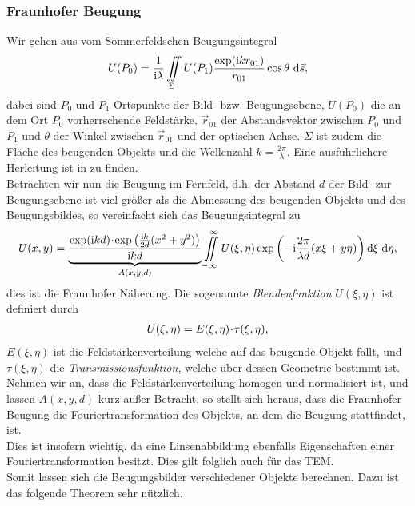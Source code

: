 \subsubsection{Fraunhofer Beugung}
Wir gehen aus vom Sommerfeldschen Beugungsintegral
\begin{align}
U(P_0)=\frac{1}{\mathrm{i}\lambda}\iint\limits_\Sigma U(P_1)\frac{\exp(\mathrm{i}kr_{01})}{r_{01}}\cos\theta~\mathrm{d} \vec{s},
\end{align}
dabei sind $P_0$ und $P_1$ Ortspunkte der Bild- bzw. Beugungsebene, $U(P_0)$ die an dem Ort $P_0$ vorherrschende Feldstärke, $\vec{r}_{01}$ der Abstandsvektor zwischen $P_0$ und $P_1$ und $\theta$ der Winkel zwischen $\vec{r}_{01}$ und der optischen Achse. $\Sigma$ ist zudem die Fläche des beugenden Objekts und die Wellenzahl $k=\frac{2\pi}{\lambda}$. Eine ausführlichere Herleitung ist in \cite{lit:goodman96} zu finden.\\
Betrachten wir nun die Beugung im Fernfeld, d.h. der Abstand $d$ der Bild- zur Beugungsebene ist viel größer als die Abmessung des beugenden Objekts und des Beugungsbildes, so vereinfacht sich das Beugungsintegral zu
\begin{align}
U(x,y)=\underbrace{\frac{\exp(\mathrm{i}kd)\!\cdot\!\exp\left(\frac{\mathrm{i}k}{2d}(x^2+y^2)\right)}{\mathrm{i}kd}}_{A(x,y,d)}\iint\limits_{-\infty}^{\infty}U(\xi,\eta)\exp\left(-\mathrm{i}\frac{2\pi}{\lambda d}(x\xi +y\eta)\right)\mathrm{d}\xi\;\mathrm{d}\eta,
\end{align}
dies ist die Fraunhofer Näherung. Die sogenannte \emph{Blendenfunktion} $U(\xi,\eta)$ ist definiert durch
\begin{align}
U(\xi,\eta)=E(\xi,\eta)\!\cdot\! \tau(\xi,\eta),
\end{align}
$E(\xi,\eta)$ ist die Feldstärkenverteilung welche auf das beugende Objekt fällt, und $\tau(\xi,\eta)$ die \emph{Transmissionsfunktion}, welche über dessen Geometrie bestimmt ist. Nehmen wir an, dass die Feldstärkenverteilung homogen und normalisiert ist, und lassen $A(x,y,d)$ kurz außer Betracht, so stellt sich heraus, dass die Fraunhofer Beugung die Fouriertransformation des Objekts, an dem die Beugung stattfindet, ist.\\
Dies ist insofern wichtig, da eine Linsenabbildung ebenfalls Eigenschaften einer Fouriertransformation besitzt. Dies gilt folglich auch für das TEM.\\
Somit lassen sich die Beugungsbilder verschiedener Objekte berechnen. Dazu ist das folgende Theorem sehr nützlich.
